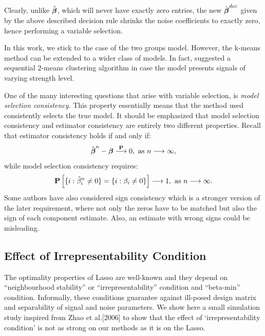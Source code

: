 \documentclass[10pt]{article}
\begin{document}
Clearly, unlike $\hat{\boldsymbol{\beta}}$, which will never have exactly zero entries, the new $\hat{\boldsymbol{\beta}}^{dec}$ given by the above described decision rule shrinks the noise coefficients to exactly zero, hence performing a variable selection.

In this work, we stick to the case of the two groups model. However, the k-means method can be extended to a wider class of models. In fact, \citet{li2017variable} suggested a sequential $2$-means clustering algorithm in case the model presents signals of varying strength level.

One of the many interesting questions that arise with variable selection, is \textit{model selection consistency}. This property essentially means that the method used consistently selects the true model. It should be emphasized that model selection consistency and estimator consistency are entirely two different properties. Recall that estimator consistency holds if and only if:\[ \hat{\boldsymbol{\beta}}^{n} -  \boldsymbol{\beta} \stackrel{{\bf P}}{\longrightarrow}0, \ \text{as } n\longrightarrow \infty,  \]
while model selection consistency requires:
\[ \P\left[ \lbrace i : \hat{\beta}_i^{n} \neq 0 \rbrace = \lbrace i : \beta_i \neq 0\rbrace \right] \longrightarrow 1, \ \text{as } n\longrightarrow \infty. \]
Some authors have also considered sign consistency which is a stronger version of the later requirement, where not only the zeros have to be matched but also the sign of each component estimate. Also, an estimate with wrong signs could be misleading. 


\subsection{Effect of Irrepresentability Condition}


The optimality properties of Lasso are well-known and they depend on ``neighbourhood stability'' or ``irrepresentability'' condition and ``beta-min'' condition. Informally, these conditions guarantee against ill-posed design matrix and separability of signal and noise parameters. We show here a small simulation study inspired from Zhao et al.[2006] to show that the effect of `irrepresentability condition' is not as strong on our methods as it is on the Lasso.
\end{document}
